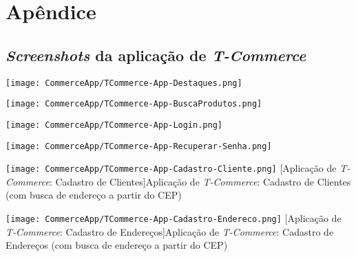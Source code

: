 \chapter*{Apêndice }

\section*{\textit{Screenshots} da aplicação de \textit{T-Commerce}}

\begin{center}
	\texttt{[image: CommerceApp/TCommerce-App-Destaques.png]}
\end{center}

\begin{center}
	\texttt{[image: CommerceApp/TCommerce-App-BuscaProdutos.png]}
\end{center}

\begin{center}
	\texttt{[image: CommerceApp/TCommerce-App-Login.png]}
\end{center}

\begin{center}
	\texttt{[image: CommerceApp/TCommerce-App-Recuperar-Senha.png]}
\end{center}

\begin{center}
	\texttt{[image: CommerceApp/TCommerce-App-Cadastro-Cliente.png]}
	[Aplicação de \textit{T-Commerce}: Cadastro de Clientes]{Aplicação de \textit{T-Commerce}: Cadastro de Clientes (com busca de endereço a partir do CEP)}
\end{center}

\begin{center}
	\texttt{[image: CommerceApp/TCommerce-App-Cadastro-Endereco.png]}
	[Aplicação de \textit{T-Commerce}: Cadastro de Endereços]{Aplicação de \textit{T-Commerce}: Cadastro de Endereços (com busca de endereço a partir do CEP)}
\end{center}

